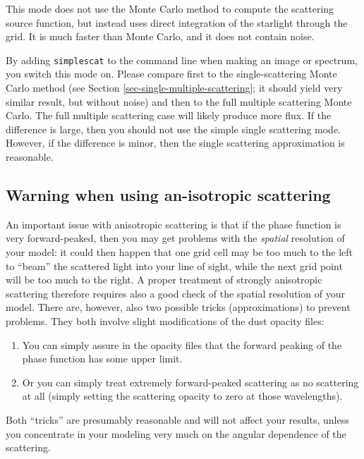 \documentclass{report}
\begin{document}
This mode does not use the Monte Carlo method to compute the scattering source
function, but instead uses direct integration of the starlight through the
grid. It is much faster than Monte Carlo, and it does not contain noise.

By adding {\small\tt simplescat} to the command line when making an image or
spectrum, you switch this mode on. Please compare first to the single-scattering
Monte Carlo method (see Section \ref{sec-single-multiple-scattering}; it should
yield very similar result, but without noise) and then to the full multiple
scattering Monte Carlo. The full multiple scattering case will likely produce
more flux. If the difference is large, then you should not use the simple
single scattering mode. However, if the difference is minor, then the single
scattering approximation is reasonable.

\subsection{Warning when using an-isotropic scattering}
An important issue with anisotropic scattering is that if the phase function
is very forward-peaked, then you may get problems with the {\em spatial}
resolution of your model: it could then happen that one grid cell may be too
much to the left to ``beam'' the scattered light into your line of sight,
while the next grid point will be too much to the right. A proper treatment
of strongly anisotropic scattering therefore requires also a good check of
the spatial resolution of your model. There are, however, also two possible
tricks (approximations) to prevent problems. They both involve slight modifications of
the dust opacity files:
\begin{enumerate}
\item You can simply assure in the opacity files that the forward peaking of
  the phase function has some upper limit.
\item Or you can simply treat extremely forward-peaked scattering as no
  scattering at all (simply setting the scattering opacity to zero at those
  wavelengths). 
\end{enumerate}
Both ``tricks'' are presumably reasonable and will not affect your results,
unless you concentrate in your modeling very much on the angular dependence
of the scattering.
\end{document}
